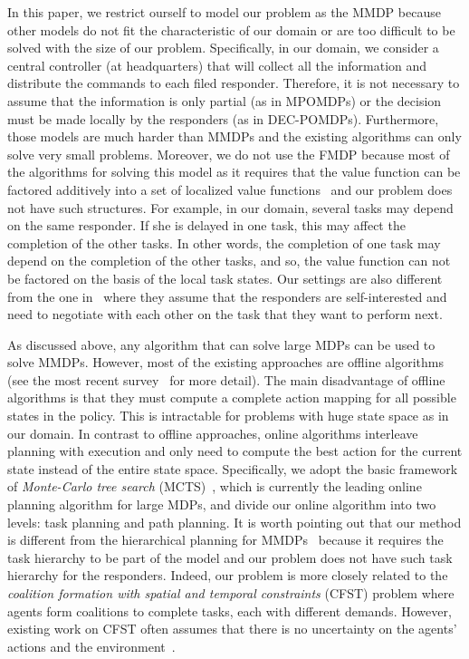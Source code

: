 In this paper, we restrict ourself to model our problem as the MMDP because other models do not fit the characteristic of our domain or are too difficult to be solved with the size of our problem. Specifically, in our domain, we consider a central controller (at headquarters) that will collect all the information and distribute the commands to each filed responder. Therefore, it is not necessary to assume that the information is only partial (as in MPOMDPs) or the decision must be made locally by the responders (as in DEC-POMDPs). Furthermore, those models are much harder than MMDPs and the existing algorithms can only solve very small problems. Moreover, we do not use the FMDP because most of the algorithms for solving this model as it requires that the value function can be factored additively into a set of localized value functions~\cite{koller2000policy,guestrin2001multiagent,guestrin2003efficient} and our problem does not have such structures. For example, in our domain, several tasks may depend on the same responder. If she is delayed in one task, this may affect the completion of the other tasks. In other words, the completion of one task may depend on the completion of the other tasks, and  so, the value function can not be factored on the basis of the local task states. Our settings are also different from the one in~\cite{Chapman2009} where they assume that the responders are self-interested and need to negotiate with each other on the task that they want to perform next.

As discussed above, any algorithm that can solve large MDPs can be used to solve MMDPs. However, most of the existing approaches are offline algorithms (see the most recent survey~\cite{kolobov2012planning} for more detail). The main disadvantage of offline algorithms is that they must compute a
complete action mapping for all possible states in the policy. This is intractable for problems with huge state space as in our domain. In contrast to offline approaches, online algorithms interleave planning with execution and only need to compute the best action for the current state instead of the entire state space. Specifically, we adopt the basic framework of {\em Monte-Carlo tree search} (MCTS)~\cite{kocsis2006bandit}, which is currently the
leading online planning algorithm for large MDPs, and divide our online algorithm into two levels: task planning and path planning. It is worth pointing out that our method is different from the hierarchical planning for MMDPs~\cite{musliner2006coordinated} because it requires the task hierarchy to be part of the model and our problem does not have such task hierarchy for the responders. Indeed, our problem is more closely related to the {\em coalition formation with spatial and temporal constraints} (CFST) problem where agents form coalitions to complete tasks, each with different demands. However, existing work on CFST often assumes that there is no uncertainty on the agents' actions and the environment~\cite{ramchurn:etal:2010}.

%
%
